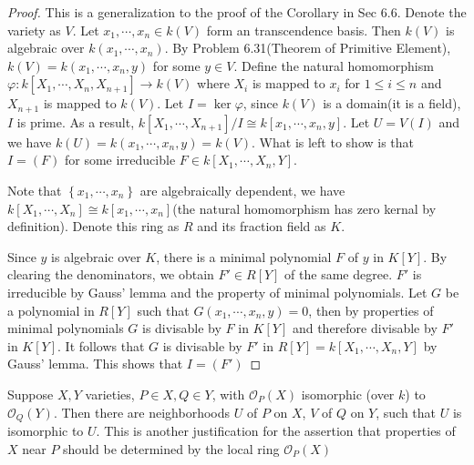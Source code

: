 \documentclass{solution}
\begin{document}
\begin{proof}
    This is a generalization to the proof of the Corollary in Sec 6.6. Denote the variety as $V$. Let $x_1, \cdots, x_n \in k(V)$ form an transcendence basis. Then $k(V)$ is algebraic over $k(x_1, \cdots, x_n)$. By Problem 6.31(Theorem of Primitive Element), $k(V) = k(x_1, \cdots, x_n, y)$ for some $y \in V$. Define the natural homomorphism $\varphi: k[X_1, \cdots, X_n, X_{n + 1}] \rightarrow k(V)$ where $X_i$ is mapped to $x_i$ for $1 \le i \le n$ and $X_{n + 1}$ is mapped to $k(V)$. Let $I = \ker \varphi$, since $k(V)$ is a domain(it is a field), $I$ is prime. As a result, $k[X_1, \cdots, X_{n + 1}] / I \cong k[x_1, \cdots, x_n, y]$. Let $U = V(I)$ and we have $k(U) = k(x_1, \cdots, x_n, y) = k(V)$. What is left to show is that $I = (F)$ for some irreducible $F \in k[X_1, \cdots, X_n, Y]$.

    Note that $\left\lbrace x_1, \cdots, x_n \right\rbrace$ are algebraically dependent, we have $k[X_1, \cdots, X_n] \cong k[x_1, \cdots, x_n]$(the natural homomorphism has zero kernal by definition). Denote this ring as $R$ and its fraction field as $K$.

    Since $y$ is algebraic over $K$, there is a minimal polynomial $F$ of $y$ in $K[Y]$. By clearing the denominators, we obtain $F' \in R[Y]$ of the same degree. $F'$ is irreducible by Gauss' lemma and the property of minimal polynomials. Let $G$ be a polynomial in $R[Y]$ such that $G(x_1, \cdots, x_n, y) = 0$, then by properties of minimal polynomials $G$ is divisable by $F$ in $K[Y]$ and therefore divisable by $F'$ in $K[Y]$. It follows that $G$ is divisable by $F'$ in $R[Y] = k[X_1, \cdots, X_n, Y]$ by Gauss' lemma. This shows that $I = (F')$
\end{proof}

\begin{problem}{6.42}
    Suppose $X, Y$ varieties, $P \in X, Q \in Y$, with $\mathcal{O}_{P}(X)$ isomorphic (over $k$) to $\mathcal{O}_{Q}(Y)$. Then there are neighborhoods $U$ of $P$ on $X$, $V$ of $Q$ on $Y$, such that $U$ is isomorphic to $U$. This is another justification for the assertion that properties of $X$ near $P$ should be determined by the local ring $\mathcal{O}_{P}(X)$
\end{problem}
\end{document}
